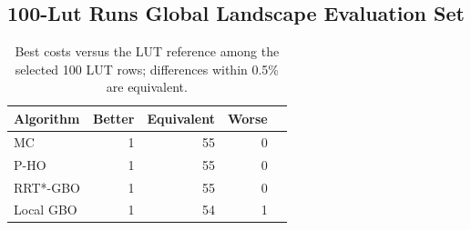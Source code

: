 \subsection{100-Lut Runs Global Landscape Evaluation Set}

\begin{table}[ht]
\centering
\caption{Best costs versus the \ac{LUT} reference among the selected 100 \ac{LUT} rows; differences within 0.5\% are equivalent.}
\label{tab:100-global-fcv-cost-comparison}
\begin{tabular}{lrrrr}
\hline
Algorithm & Better & Equivalent & Worse \\
\hline
MC & 1 & 55 & 0 \\
P-HO & 1 & 55 & 0 \\
RRT*-GBO & 1 & 55 & 0\\
Local GBO & 1 & 54 & 1 \\
\hline
\end{tabular}
\end{table}


